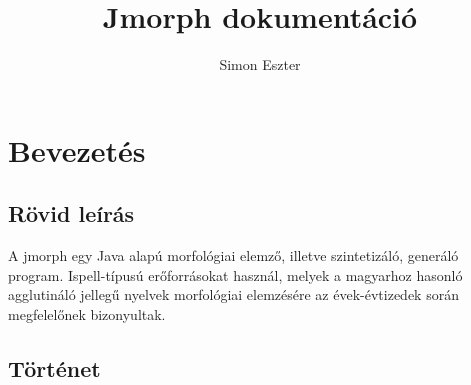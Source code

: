 \documentclass{article}
\begin{document}
\title{Jmorph dokument\'aci\'o}
\author{Simon Eszter}
\maketitle

\section{Bevezet\'es}
\subsection{R\"ovid le\'{i}r\'as}

A jmorph egy Java alap\'u morfol\'ogiai elemz\H{o}, illetve szintetiz\'al\'o, gener\'al\'o program. Ispell-t\'{i}pus\'u er\H{o}forr\'asokat haszn\'al, melyek a magyarhoz hasonl\'o agglutin\'al\'o jelleg\H{u} nyelvek morfol\'ogiai elemz\'es\'ere az \'evek-\'evtizedek sor\'an megfelel\H{o}nek bizonyultak. 

\subsection{T\"ort\'enet}
\end{document}
